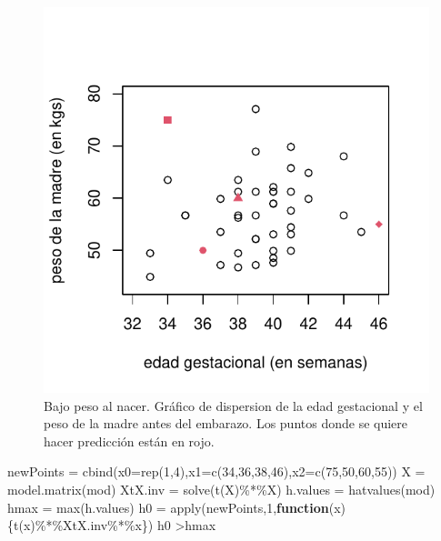 \documentclass[
]{article}
\newenvironment{Shaded}{\begin{snugshade}}{\end{snugshade}}
\newcommand{\AttributeTok}[1]{\textcolor[rgb]{0.77,0.63,0.00}{#1}}
\newcommand{\ControlFlowTok}[1]{\textcolor[rgb]{0.13,0.29,0.53}{\textbf{#1}}}
\newcommand{\DecValTok}[1]{\textcolor[rgb]{0.00,0.00,0.81}{#1}}
\newcommand{\FunctionTok}[1]{\textcolor[rgb]{0.00,0.00,0.00}{#1}}
\newcommand{\NormalTok}[1]{#1}
\newcommand{\OtherTok}[1]{\textcolor[rgb]{0.56,0.35,0.01}{#1}}
\newcommand{\SpecialCharTok}[1]{\textcolor[rgb]{0.00,0.00,0.00}{#1}}
\begin{document}
\begin{figure}

{\centering \includegraphics{MLGI_files/figure-latex/birthweightExtrapolacion-1} 

}

\caption{Bajo peso al nacer. Gráfico de dispersion de la edad gestacional y el peso de la madre antes del embarazo. Los puntos donde se quiere hacer predicción están en rojo.}\label{fig:birthweightExtrapolacion}
\end{figure}

\begin{Shaded}
\begin{Highlighting}[]
\NormalTok{newPoints }\OtherTok{=} \FunctionTok{cbind}\NormalTok{(}\AttributeTok{x0=}\FunctionTok{rep}\NormalTok{(}\DecValTok{1}\NormalTok{,}\DecValTok{4}\NormalTok{),}\AttributeTok{x1=}\FunctionTok{c}\NormalTok{(}\DecValTok{34}\NormalTok{,}\DecValTok{36}\NormalTok{,}\DecValTok{38}\NormalTok{,}\DecValTok{46}\NormalTok{),}\AttributeTok{x2=}\FunctionTok{c}\NormalTok{(}\DecValTok{75}\NormalTok{,}\DecValTok{50}\NormalTok{,}\DecValTok{60}\NormalTok{,}\DecValTok{55}\NormalTok{))}
\NormalTok{X }\OtherTok{=} \FunctionTok{model.matrix}\NormalTok{(mod)}
\NormalTok{XtX.inv }\OtherTok{=} \FunctionTok{solve}\NormalTok{(}\FunctionTok{t}\NormalTok{(X)}\SpecialCharTok{\%*\%}\NormalTok{X)}
\NormalTok{h.values }\OtherTok{=} \FunctionTok{hatvalues}\NormalTok{(mod)}
\NormalTok{hmax }\OtherTok{=} \FunctionTok{max}\NormalTok{(h.values)}
\NormalTok{h0 }\OtherTok{=} \FunctionTok{apply}\NormalTok{(newPoints,}\DecValTok{1}\NormalTok{,}\ControlFlowTok{function}\NormalTok{(x)\{}\FunctionTok{t}\NormalTok{(x)}\SpecialCharTok{\%*\%}\NormalTok{XtX.inv}\SpecialCharTok{\%*\%}\NormalTok{x\})}
\NormalTok{h0 }\SpecialCharTok{\textgreater{}}\NormalTok{hmax}
\end{Highlighting}
\end{Shaded}
\end{document}

